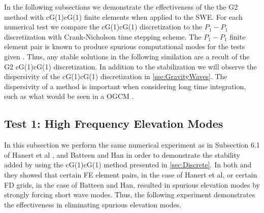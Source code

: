In the following subsections we demonstrate the effectiveness of the the G2
method with cG(1)cG(1) finite elements when applied to the SWE. For each
numerical test we compare the cG(1)cG(1) discretization to the $P_1-P_1$
discretization with Crank-Nicholson time stepping scheme. The $P_1-P_1$ finite
element pair is known to produce spurious computational modes for the tests
given \cite{Le-Roux1998,Hanert2006}. Thus, any stable solutions in the following
similation are a result of the G2 cG(1)cG(1) discretization. In addition to the
stabilization we will observe the dispersivity of the cG(1)cG(1) discretization
in \autoref{sse:GravityWaves}. The dispersivity of a method is important when
considering long time integration, such as what would be seen in a OGCM
\cite{Le_Roux1998}.

\subsection{Test 1: High Frequency Elevation Modes} \label{sse:HFElevModes}
  In this subsection we perform the same numerical experiment as in Subsection
  6.1 of Hanert et al \cite{Hanert2002}, and Batteen and Han \cite{Batteen1981}
  in order to demonstrate the stability added by using the cG(1)cG(1) method
  presented in \autoref{sec:Discrete}. In both \cite{Hanert2002} and
  \cite{Batteen1981} they showed that certain FE element pairs, in the case of
  Hanert et al, or certain FD grids, in the case of Batteen and Han, resulted in
  spurious elevation modes by strongly forcing short wave modes. Thus, the
  following experiment demonstrates the effectiveness in eliminating spurious
  elevation modes.

